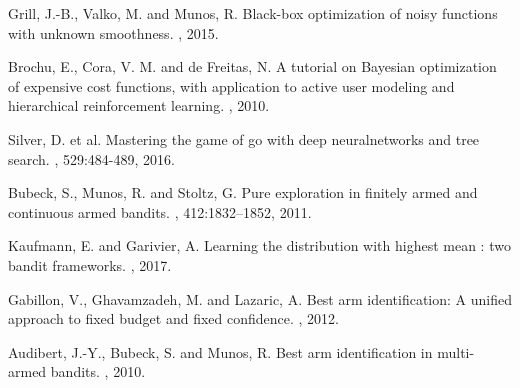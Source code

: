 \documentclass[12pt]{article}
\theoremstyle{plain} \numberwithin{equation}{section}
\theoremstyle{definition}
\begin{document}
\begin{thebibliography}{99}
\newblock Grill, J.-B., Valko, M. and Munos, R.
\newblock Black-box optimization of noisy functions with unknown smoothness.
, 2015.

\newblock Brochu, E., Cora, V. M. and de Freitas, N.
\newblock A tutorial on Bayesian optimization of expensive cost functions, with application to active user modeling and hierarchical reinforcement learning.
, 2010.

\newblock Silver, D. et al.
\newblock Mastering the game of go with deep neuralnetworks and tree search.
, 529:484-489, 2016.

\newblock Bubeck, S., Munos, R. and Stoltz, G.
\newblock Pure exploration in finitely armed and continuous armed bandits.
, 412:1832–1852, 2011.

\newblock Kaufmann, E. and Garivier, A.
\newblock Learning the distribution with highest mean : two bandit frameworks.
, 2017.

\newblock Gabillon, V., Ghavamzadeh, M. and Lazaric, A.
\newblock Best arm identification: A unified approach to fixed budget and fixed confidence.
, 2012.

\newblock Audibert, J.-Y., Bubeck, S. and Munos, R.
\newblock Best arm identification in multi-armed bandits.
, 2010.


\end{thebibliography}
\end{document}
